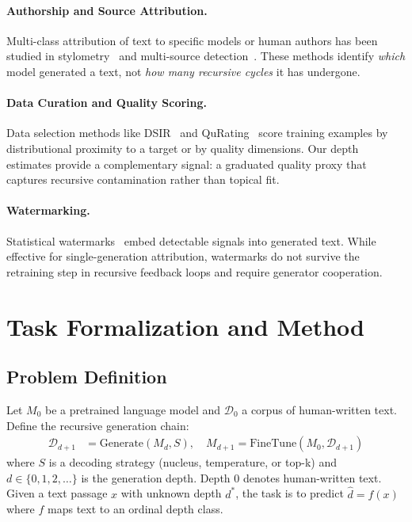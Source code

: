 \documentclass[11pt,a4paper]{article}
\begin{document}
\paragraph{Authorship and Source Attribution.}
Multi-class attribution of text to specific models or human authors has been studied in stylometry~\citep{uchendu2020authorship} and multi-source detection~\citep{li2024mage}. These methods identify \emph{which} model generated a text, not \emph{how many recursive cycles} it has undergone.

\paragraph{Data Curation and Quality Scoring.}
Data selection methods like DSIR~\citep{xie2023data} and QuRating~\citep{wettig2024qurating} score training examples by distributional proximity to a target or by quality dimensions. Our depth estimates provide a complementary signal: a graduated quality proxy that captures recursive contamination rather than topical fit.

\paragraph{Watermarking.}
Statistical watermarks~\citep{kirchenbauer2023watermark} embed detectable signals into generated text. While effective for single-generation attribution, watermarks do not survive the retraining step in recursive feedback loops and require generator cooperation.

\section{Task Formalization and Method}

\subsection{Problem Definition}

Let $M_0$ be a pretrained language model and $\mathcal{D}_0$ a corpus of human-written text. Define the recursive generation chain:
\begin{align}
    \mathcal{D}_{d+1} &= \text{Generate}(M_d, S), \quad M_{d+1} = \text{FineTune}(M_0, \mathcal{D}_{d+1})
\end{align}
where $S$ is a decoding strategy (nucleus, temperature, or top-k) and $d \in \{0, 1, 2, \ldots\}$ is the generation depth. Depth 0 denotes human-written text. Given a text passage $x$ with unknown depth $d^*$, the task is to predict $\hat{d} = f(x)$ where $f$ maps text to an ordinal depth class.
\end{document}
